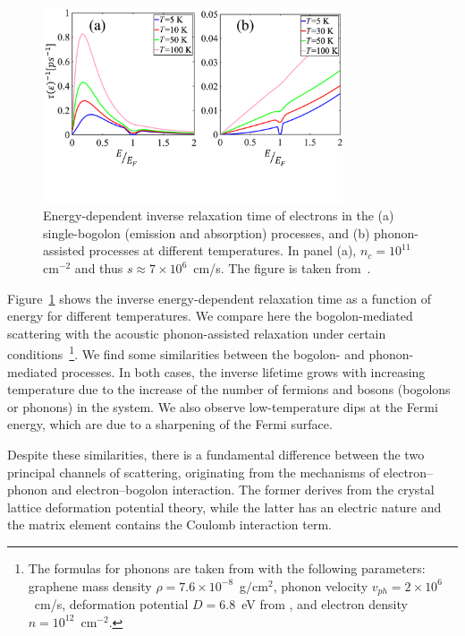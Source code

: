 %
%
%
\begin{figure}[ht]
    \centering
    \includegraphics[width=0.79\textwidth]{Fig/Ch6/Fig3.pdf}
    \caption[Energy-dependent inverse relaxation time]{Energy-dependent inverse relaxation time of electrons in the (a) single-bogolon (emission and absorption) processes, and (b) phonon-assisted processes at different temperatures. In panel (a), $n_c=10^{11}$ cm$^{-2}$ and thus $s\approx 7\times 10^6$~cm/s. The figure is taken from~\cite{Sun:2019aa}.}
    \label{fig:CH6_3}
\end{figure}
%
%
%
Figure~\ref{fig:CH6_3} shows the inverse energy-dependent relaxation time as a function of energy for different temperatures.
We compare here the bogolon-mediated scattering with the acoustic phonon-assisted relaxation under certain conditions~\footnote{The formulas for phonons are taken from \cite{Hwang:2008aa} with the following parameters: graphene mass density $\rho=7.6\times 10^{-8}$~g$/$cm$^2$, phonon velocity $v_{ph}=2\times 10^6$~cm/s, deformation potential $D=6.8$~eV from \cite{Kaasbjerg:2012aa}, and electron density $n=10^{12}$~cm$^{-2}$.}.
%
We find some similarities between the bogolon- and phonon-mediated processes. In both cases, the inverse lifetime grows with increasing temperature due to the increase of the number of fermions and bosons (bogolons or phonons) in the system.
We also observe low-temperature dips at the Fermi energy, which are due to a sharpening of the Fermi surface.

Despite these similarities, there is a fundamental difference between the two principal channels of scattering, originating from the mechanisms of electron--phonon and electron--bogolon interaction.
The former derives from the crystal lattice deformation potential theory, while the latter has an electric nature and the matrix element contains the Coulomb interaction term.

